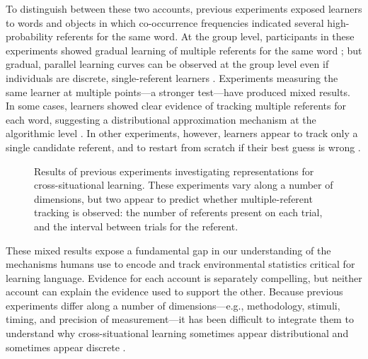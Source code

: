 \documentclass{pnastwo}
\begin{document}
\begin{article}
To distinguish between these two accounts, previous experiments exposed learners to words and objects in which co-occurrence frequencies indicated several high-probability referents for the same word. At the group level, participants in these experiments showed gradual learning of multiple referents for the same word \citep[e.g.,][]{Vouloumanos2008, Yurovsky2013}; but gradual, parallel learning curves can be observed at the group level even if individuals are discrete, single-referent learners \citep{Gallistel2004, Medina2011}. Experiments measuring the same learner at multiple points---a stronger test---have produced mixed results. In some cases, learners showed clear evidence of tracking multiple referents for each word, suggesting a distributional approximation mechanism at the algorithmic level \citep{Smith2011a, Yurovsky2013a, Dautriche2014}. In other experiments, however, learners appear to track only a single candidate referent, and to restart from scratch if their best guess is wrong \citep{Medina2011, Trueswell2013}. 

 \begin{figure}[t]
	\caption{\label{fig:mrefs} Results of previous experiments investigating representations for cross-situational learning. These experiments vary along a number of dimensions, but two appear to predict whether multiple-referent tracking is observed: the number of referents present on each trial, and the interval between trials for the referent.}
\end{figure}

These mixed results expose a fundamental gap in our understanding of the mechanisms humans use to encode and track environmental statistics critical for learning language. Evidence for each account is separately compelling, but neither account can explain the evidence used to support the other. Because previous experiments differ along a number of dimensions---e.g., methodology, stimuli, timing, and precision of measurement---it has been difficult to integrate them to understand why cross-situational learning sometimes appear distributional and sometimes appear discrete \citep[for review, see][]{Yurovsky2014}. 


\end{article}
\end{document}
